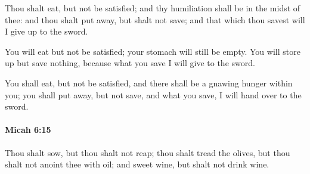 			\begin{versebox}
					\item[BHS] 
					\item[LXX] 
					\item[ASV] Thou shalt eat, but not be satisfied; and thy humiliation shall be in the midst of thee: and thou shalt put away, but shalt not save; and that which thou savest will I give up to the sword.
					\item[NIV] You will eat but not be satisfied; your stomach will still be empty. You will store up but save nothing, because what you save I will give to the sword.
					\item[NRSV] You shall eat, but not be satisfied, and there shall be a gnawing hunger within you; you shall put away, but not save, and what you save, I will hand over to the sword.
			\end{versebox}

		\paragraph{Micah 6:15} %
			\label{MICAH-6-15}

			Thou shalt sow, but thou shalt not reap; thou shalt tread the olives, but thou shalt not anoint thee with oil; and sweet wine, but shalt not drink wine.

